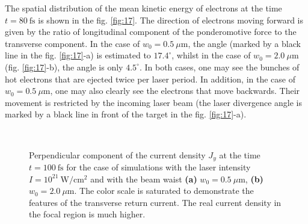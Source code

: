 The spatial distribution of the mean kinetic energy of electrons at the time $ t = 80 \ \mathrm{fs} $ is shown in the fig. \ref{fig:17}. The direction of electrons moving forward is given by the ratio of longitudinal component of the ponderomotive force to the transverse component. In the case of $ w_0 = 0.5 \ \mu\mathrm{m} $, the angle (marked by a black line in the fig. \ref{fig:17}-a) is estimated to $ 17.4^{\circ} $, whilst in the case of $ w_0 = 2.0 \ \mu\mathrm{m} $ (fig. \ref{fig:17}-b), the angle is only $ 4.5^{\circ} $. In both cases, one may see the bunches of hot electrons that are ejected twice per laser period. In addition, in the case of $ w_0 = 0.5 \ \mu\mathrm{m} $, one may also clearly see the electrons that move backwards. Their movement is restricted by the incoming laser beam (the laser divergence angle is marked by a black line in front of the target in the fig. \ref{fig:17}-a).

\begin{figure}[h!]
	\centering
	\\[2mm]
	\caption{Perpendicular component of the current density $ J_{y} $ at the time $ t = 100 \ \mathrm{fs} $ for the case of simulations with the laser intensity $ I = 10^{21} \ \mathrm{W/cm^2} $ and with the beam waist \textbf{(a)} $ w_0 = 0.5 \ \mu\mathrm{m} $, \textbf{(b)} $ w_0 = 2.0 \ \mu\mathrm{m} $. The color scale is saturated to demonstrate the features of the transverse return current. The real current density in the focal region is much higher.}
	\label{fig:18}
\end{figure}

